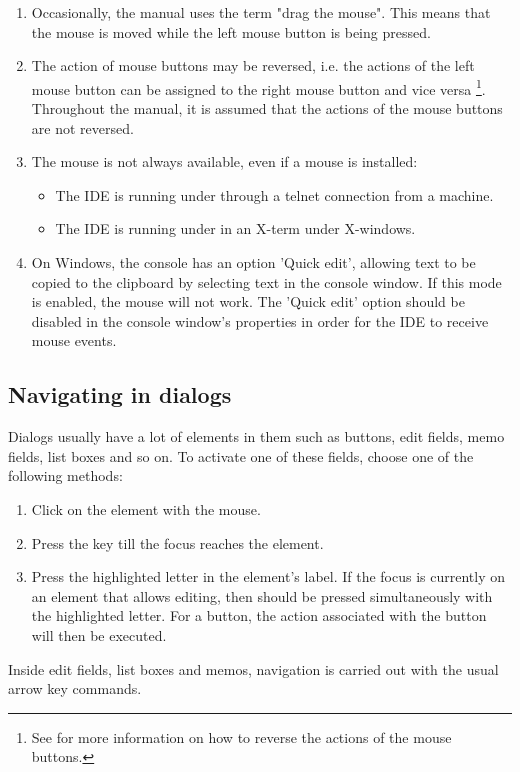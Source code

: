 \begin{remark}
\begin{enumerate}
\item Occasionally, the manual uses the term "drag the mouse". This
means that the mouse is moved while the left mouse button is being
pressed.
\item
The action of mouse buttons may be reversed, i.e. the actions of the left
mouse button can be assigned to the right mouse button and vice versa
\footnote{See  for more information on how to reverse the
actions of the mouse buttons.}. Throughout the manual, it is assumed
that the actions of the mouse buttons are not reversed.
\item
The mouse is not always available, even if a mouse is installed:
\begin{itemize}
\item The IDE is running under \linux through a telnet connection from
a \windows machine.
\item The IDE is running under \linux in an X-term under X-windows.
\end{itemize}
\item On Windows, the console has an option 'Quick edit', allowing text
to be copied to the clipboard by selecting text in the console window. If this
mode is enabled, the mouse will not work. The 'Quick edit' option should be
disabled in the console window's properties in order for the IDE to receive mouse
events.
\end{enumerate}
\end{remark}
%
%
\subsection{Navigating in dialogs}
\label{se:navigatingdialogs}
Dialogs usually have a lot of elements in them such as buttons, edit fields,
memo fields, list boxes and so on. To activate one of these fields, choose
one of the following methods:
\begin{enumerate}
\item Click on the element with the mouse.
\item Press the  key till the focus reaches the element.
\item Press the highlighted letter in the element's label. If the focus
is currently on an element that allows editing, then  should be
pressed simultaneously with the highlighted letter. For a button, the action
associated with the button will then be executed.
\end{enumerate}
Inside edit fields, list boxes and memos, navigation is carried out with the
usual arrow key commands.

